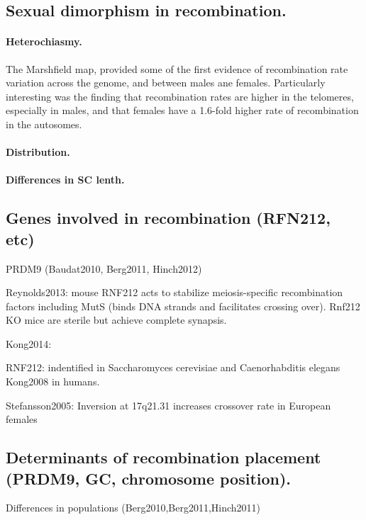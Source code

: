 \subsection{Sexual dimorphism in recombination.}
\paragraph{Heterochiasmy.}

The Marshfield map\cite{Broman1998}, provided some of the first evidence of recombination rate variation across the genome, and between males ane females.
Particularly interesting was the finding that recombination rates are higher in the telomeres, especially in males, and that females have a 1.6-fold higher rate of recombination in the autosomes.

\paragraph{Distribution.}
\paragraph{Differences in SC lenth.}

\subsection{Genes involved in recombination (RFN212, etc)}

PRDM9 (Baudat2010, Berg2011, Hinch2012)

Reynolds2013: mouse RNF212 acts to stabilize meiosis-specific recombination factors including MutS (binds DNA strands and facilitates crossing over).
Rnf212 KO mice are sterile but achieve complete synapsis.

Kong2014: 

RNF212: indentified in Saccharomyces cerevisiae and Caenorhabditis elegans
Kong2008 in humans.

Stefansson2005: Inversion at 17q21.31 increases crossover rate in European females

\subsection{Determinants of recombination placement (PRDM9, GC, chromosome position).}

Differences in populations (Berg2010,Berg2011,Hinch2011)

